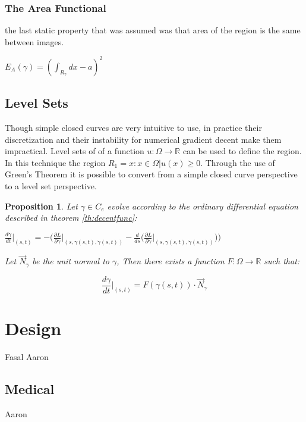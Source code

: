 \documentclass{article}
\newcommand{\R}{\mathds{R}}
\newtheorem{prop}{Proposition}
\begin{document}
			\subsubsection{The Area Functional}
				the last static property that was assumed was that area of the region is the same between images.
				\begin{center}
					$E_{A}(\gamma) = (\int_{R_\gamma}{dx} - a)^2$
				\end{center}

		\subsection{Level Sets}
			Though simple closed curves are  very intuitive to use, in practice their discretization and their instability for numerical gradient decent make them impractical. Level sets of of a function $u:\Omega\rightarrow\R$ can be used to define the region. In this technique the region $R_1 = {x: x\in\Omega|u(x)\geq0}$. Through the use of Green's Theorem it is possible to convert from a simple closed curve perspective to a level set perspective.

			\begin{prop}\label{pr:curvtofn}
				Let $\gamma\in C_e$ evolve according to the ordinary differential equation described in theorem \ref{th:decentfunc}:
				\begin{center}
					$\frac{d\gamma}{dt}\biggr\rvert_{(s,t)} = - \Bigg(\frac{\partial L}{\partial \gamma}\biggr\rvert_{(s,\gamma(s,t),\dot\gamma(s,t))} - \frac{d}{ds}\bigg(\frac{\partial L}{\partial \dot\gamma}\biggr\rvert_{(s,\gamma(s,t),\dot\gamma(s,t))}\bigg)\Bigg)$
				\end{center}
				Let $\vec N_\gamma$ be the unit normal to $\gamma$, Then there exists a function $F : \Omega \rightarrow \R$ such that:

				\begin{equation}\label{eq:greenscurv}
					\frac{d\gamma}{dt}\biggr\rvert_{(s,t)} = F(\gamma(s,t))\cdot \vec N_\gamma
				\end{equation}

			\end{prop}




	\section{Design}
		Fasal Aaron

		\subsection{Medical}
			Aaron
\end{document}
